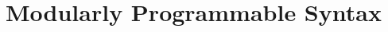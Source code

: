 \documentclass[12pt]{cmuthesis}
\newcommand{\todolater}[1]{{\color{magenta} TODO (Later): #1}}
\newcommand{\todo}[1]{{\color{red} TODO: #1}}
\begin{document}


\tableofcontents
\listoffigures

\mainmatter



%
%
%
%
%






\part{Modularly Programmable Syntax}\label{part:syntax}




\end{document}
